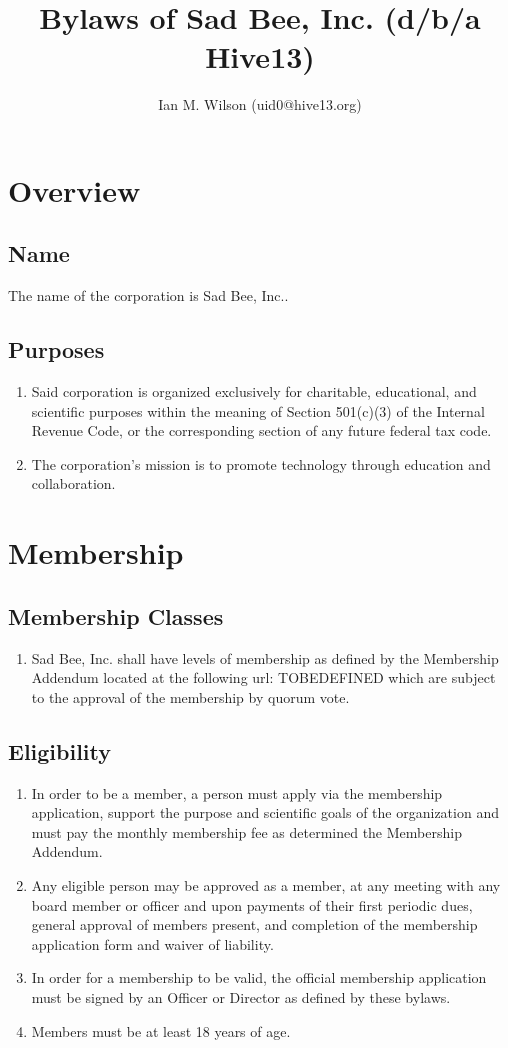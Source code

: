 \documentclass{article}
\title{Bylaws of Sad Bee, Inc. (d/b/a Hive13)}
\author{Ian M. Wilson (uid0@hive13.org)}
\begin{document}
\maketitle
\section{Overview}
\subsection{Name}
The name of the corporation is Sad Bee, Inc..
\subsection{Purposes}
\begin{enumerate}
    \item Said corporation is organized exclusively for charitable, educational,
and scientific purposes within the meaning of Section 501(c)(3) of the Internal
Revenue Code, or the corresponding section of any future federal tax code.
    \item The corporation's mission is to promote technology through education and 
collaboration.
\end{enumerate}
\section{Membership}
\subsection{Membership Classes}
\begin{enumerate}
    \item Sad Bee, Inc. shall have levels of membership as defined by the
    Membership Addendum located at the following url: TOBEDEFINED which are
    subject to the approval of the membership by quorum vote.
\end{enumerate}
\subsection{Eligibility}
\begin{enumerate}
    \item In order to be a member, a person must apply via the membership
    application, support the purpose and scientific goals of the organization
    and must pay the monthly membership fee as determined the Membership
    Addendum.
    \item Any eligible person may be approved as a member, at any meeting with
    any board member or officer and upon payments of their first periodic dues,
    general approval of members present, and completion of the membership
    application form and waiver of liability.
    \item In order for a membership to be valid, the official membership
    application must be signed by an Officer or Director as defined by these
    bylaws.
    \item Members must be at least 18 years of age.
\end{enumerate}
\end{document}
